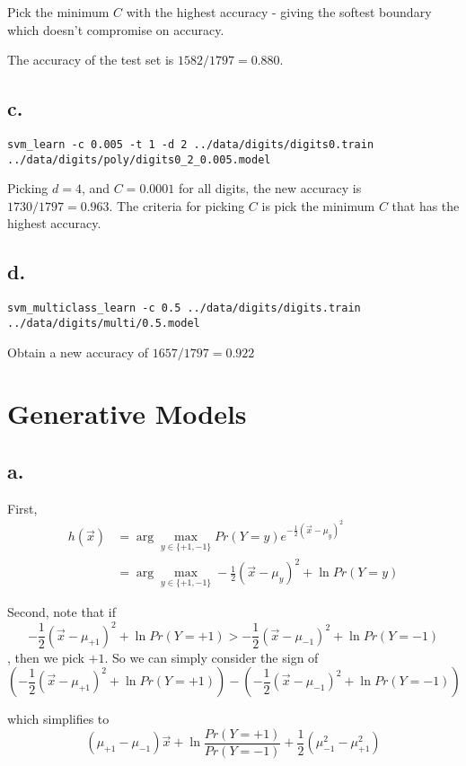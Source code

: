 \documentclass[]{article}
\begin{document}
Pick the minimum $C$ with the highest accuracy - giving the softest boundary which doesn't compromise on accuracy.

The accuracy of the test set is $1582/1797 = 0.880$.

\subsection*{c.}
\begin{verbatim}
svm_learn -c 0.005 -t 1 -d 2 ../data/digits/digits0.train ../data/digits/poly/digits0_2_0.005.model
\end{verbatim}
Picking $d=4$, and $C = 0.0001$ for all digits, the new accuracy is $1730/1797 = 0.963$. The criteria for picking $C$ is pick the minimum $C$ that has the highest accuracy.

\subsection*{d.}
\begin{verbatim}
svm_multiclass_learn -c 0.5 ../data/digits/digits.train ../data/digits/multi/0.5.model
\end{verbatim}

Obtain a new accuracy of $1657/1797 = 0.922$

\section{Generative Models}

\subsection*{a.}
First,
\begin{align*}
h(\vec x) &= \arg \max_{y \in \{+1,-1\}} Pr(Y=y)e^{-\frac{1}{2}(\vec x - \mu_{y})^2} \\
&= \arg \max_{y \in \{+1,-1\}} -\frac{1}{2}(\vec x - \mu_y)^2 + \ln Pr(Y=y)
\end{align*}

Second, note that if \[-\frac{1}{2}(\vec x - \mu_{+1})^2 + \ln Pr(Y=+1) > -\frac{1}{2}(\vec x - \mu_{-1})^2 + \ln Pr(Y=-1)\], then we pick $+1$. So we can simply consider the sign of \[\left(-\frac{1}{2}(\vec x - \mu_{+1})^2 + \ln Pr(Y=+1)\right) - \left( -\frac{1}{2}(\vec x - \mu_{-1})^2 + \ln Pr(Y=-1) \right)\]

which simplifies to \[(\mu_{+1}-\mu_{-1})\vec x + \ln \frac{Pr(Y=+1)}{Pr(Y=-1)} + \frac{1}{2}(\mu_{-1}^2 - \mu_{+1}^2)\]
\end{document}
